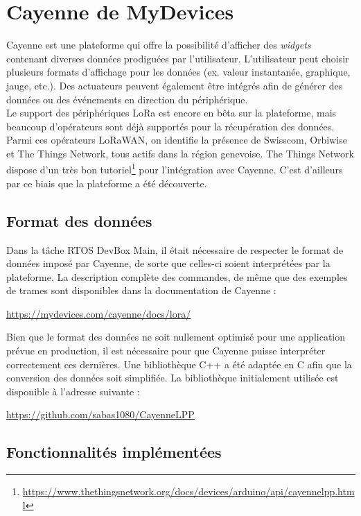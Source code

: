 \section{Cayenne de MyDevices}

Cayenne est une plateforme qui offre la possibilité d'afficher des \textit{widgets} contenant diverses données prodiguées par l'utilisateur. L'utilisateur peut choisir plusieurs formats d'affichage pour les données (ex. valeur instantanée, graphique, jauge, etc.). Des actuateurs peuvent également être intégrés afin de générer des données ou des événements en direction du périphérique. \\

Le support des périphériques LoRa est encore en bêta sur la plateforme, mais beaucoup d'opérateurs sont déjà supportés pour la récupération des données. Parmi ces opérateurs LoRaWAN, on identifie la présence de Swisscom, Orbiwise et The Things Network, tous actifs dans la région genevoise. The Things Network dispose d'un très bon tutoriel\footnote{\url{https://www.thethingsnetwork.org/docs/devices/arduino/api/cayennelpp.html}} pour l'intégration avec Cayenne. C'est d'ailleurs par ce biais que la plateforme a été découverte.

\subsection{Format des données}
Dans la tâche RTOS DevBox Main, il était nécessaire de respecter le format de données imposé par Cayenne, de sorte que celles-ci soient interprétées par la plateforme. La description complète des commandes, de même que des exemples de trames sont disponibles dans la documentation de Cayenne : 
\begin{center}
    \url{https://mydevices.com/cayenne/docs/lora/}
\end{center}

Bien que le format des données ne soit nullement optimisé pour une application prévue en production, il est nécessaire pour que Cayenne puisse interpréter correctement ces dernières. Une bibliothèque C++ a été adaptée en C afin que la conversion des données soit simplifiée. La bibliothèque initialement utilisée est disponible à l'adresse suivante : 
\begin{center}
    \url{https://github.com/sabas1080/CayenneLPP}
\end{center}


\subsection{Fonctionnalités implémentées}

